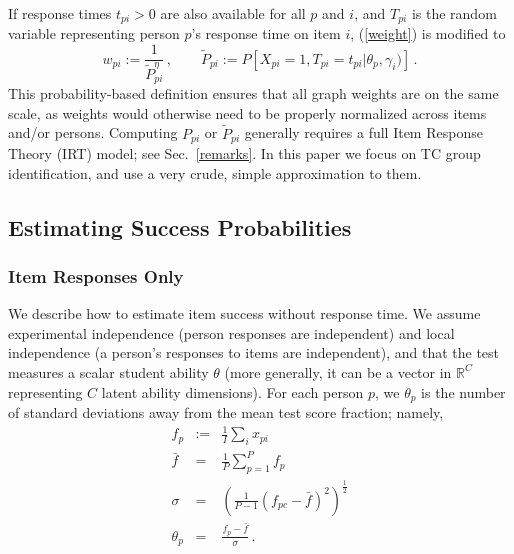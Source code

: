 \documentclass{article}
\newcommand{\R}{\mathbb{R}}
\begin{document}
If response times $t_{pi} > 0$ are also available for all $p$ and $i$, and $T_{pi}$ is the random variable representing person $p$'s response time on item $i$, (\ref{weight}) is modified to
\begin{equation}
  w_{pi} := \frac{1}{\tilde{P}_{pi}^{\eta}}\,,\qquad \tilde{P}_{pi} := P \left[X_{pi}=1, T_{pi}=t_{pi} | \theta_p, \gamma_i) \right]\,.
\end{equation}
This probability-based definition ensures that all graph weights are on the same scale, as weights would otherwise need to be properly normalized across items and/or persons. Computing $P_{pi}$ or $\tilde{P}_{pi}$ generally requires a full Item Response Theory (IRT) model; see Sec.~\ref{remarks}. In this paper we focus on TC group identification, and use a very crude, simple approximation to them.

\subsection{Estimating Success Probabilities}
\label{ability_estimation}

\subsubsection{Item Responses Only}
We describe how to estimate item success without response time. We assume experimental independence (person responses are independent) and local independence (a person's responses to items are independent), and that the test measures a scalar student ability $\theta$ (more generally, it can be a vector in $\R^C$ representing $C$ latent ability dimensions). For each person $p$, we $\theta_p$ is the number of standard deviations away from the mean test score fraction; namely,
\begin{eqnarray}
	f_{p} &:=& \frac{1}{I} \sum_i x_{pi} \\
	\bar{f} &=& \frac{1}{P} \sum_{p=1}^{P} f_{p} \\
	\sigma &=& \left(\frac{1}{P-1} (f_{pc} - \bar{f})^2 \right)^{\frac12} \\
	\theta_{p} &=& \frac{f_{p} - \bar{f}}{\sigma}\,.
	\label{theta_init}
\end{eqnarray}
\end{document}
